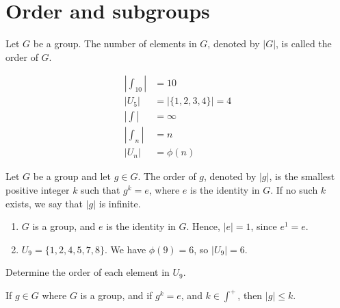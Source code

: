 \section{Order and subgroups}
    \renewcommand{\leftmark}{February 19, 2024}

    \begin{dfn}
        Let \(G\) be a group. The number of elements in \(G\), denoted by \(|G|\), is called the order of \(G\).
    \end{dfn}

    \begin{example}
        \begin{align*}
            |\int_{10}| &= 10 \\
            |U_5| &= |\{1, 2, 3, 4\}| = 4 \\
            |\int| &= \infty \\
            |\int_n| &= n \\
            |U_n| &= \phi(n)
        \end{align*}
    \end{example}

    \begin{dfn}
        Let \(G\) be a group and let \(g\in G\). The order of \(g\), denoted by \(|g|\), is the smallest positive integer \(k\) such that \(g^k = e\), where \(e\) is the identity in \(G\). If no such \(k\) exists, we say that \(|g|\) is infinite.
    \end{dfn}

    \begin{example}

        \mbox{}

        \begin{enumerate}
            \item \(G\) is a group, and \(e\) is the identity in \(G\). Hence, \(|e| = 1\), since \(e^1 = e\).

            \item \(U_9 = \{1, 2, 4, 5, 7, 8\}\). We have \(\phi(9) = 6\), so \(|U_9| = 6\).
        \end{enumerate}
    \end{example}

    \begin{example}
        Determine the order of each element in \(U_9\).
    \end{example}

    \begin{thm}
        If \(g\in G\) where \(G\) is a group, and if \(g^k = e\), and \(k\in \int^+\), then \(|g| \leq k\).
    \end{thm}

